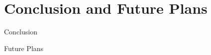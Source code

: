 \documentclass{beamer}
\begin{document}
\section{Conclusion and Future Plans}
\begin{frame}
\begin{block}{Conclusion}

\end{block}
\end{frame}
\begin{frame}
\begin{block}{Future Plans}

\end{block}
\end{frame}

\end{document}
